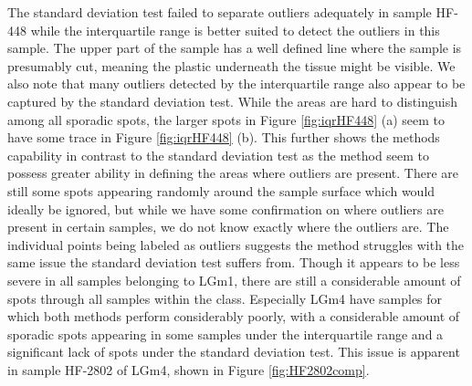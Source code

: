 The standard deviation test failed to separate outliers adequately in sample HF-448 while the interquartile range is better suited to detect the outliers in this sample. The upper part of the sample has a well defined line where the sample is presumably cut, meaning the plastic underneath the tissue might be visible. We also note that many outliers detected by the interquartile range also appear to be captured by the standard deviation test. While the areas are hard to distinguish among all sporadic spots, the larger spots in Figure \ref{fig:iqrHF448} (a) seem to have some trace in Figure \ref{fig:iqrHF448} (b). This further shows the methods capability in contrast to the standard deviation test as the method seem to possess greater ability in defining the areas where outliers are present. There are still some spots appearing randomly around the sample surface which would ideally be ignored, but while we have some confirmation on where outliers are present in certain samples, we do not know exactly where the outliers are. The individual points being labeled as outliers suggests the method struggles with the same issue the standard deviation test suffers from. Though it appears to be less severe in all samples belonging to LGm1, there are still a considerable amount of spots through all samples within the class. Especially LGm4 have samples for which both methods perform considerably poorly, with a considerable amount of sporadic spots appearing in some samples under the interquartile range and a significant lack of spots under the standard deviation test. This issue is apparent in sample HF-2802 of LGm4, shown in Figure \ref{fig:HF2802comp}.


